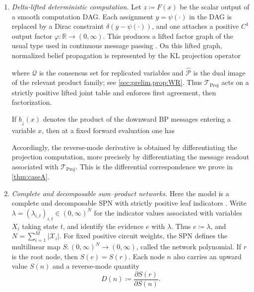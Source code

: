 \documentclass[12pt]{article}
\newcommand{\1}{\mathbb{1}}
\renewcommand{\phi}{\varphi}
\newcommand{\defeq}{\coloneq}
\theoremstyle{definition}
\newcommand*\mybluebox[1]{%
    \colorbox{myblue}{\hspace{1em}#1\hspace{1em}}}
\newcommand{\Iproj}{\overleftarrow{\pi}}     %
\newcommand{\Rproj}{\overrightarrow{\pi}}    %
\newcommand*\mygreenbox[1]{%
    \colorbox{mygreen}{\hspace{1em}#1\hspace{1em}}}
\begin{document}
\begin{enumerate}[leftmargin=2em,itemsep=0.35em]

\item[\textup{(A)}]
\emph{Delta-lifted deterministic computation.}
Let $z \coloneqq F(x)$ be the scalar output of a smooth computation DAG. Each assignment $y=\psi(\cdot)$ in the DAG is replaced by a Dirac
constraint $\delta(y-\psi(\cdot))$, and one attaches a positive $C^1$ output factor $\phi:\mathbb{R}\to(0,\infty)$. This produces a lifted factor graph of the usual type used in
continuous message passing \cite{yedidia2005constructing}. On this lifted graph, normalized belief propagation is represented by
the KL projection operator
where $\mathcal Q$ is the consensus set for replicated variables and
$\widehat{\mathcal P}$ is the dual image of the relevant product
family; see \cref{sec:prelim,prop:WR}.
Thus $\mathcal T_{\mathrm{Proj}}$ acts on a strictly positive lifted
joint table and enforces first agreement, then factorization.

If $b_\downarrow(x)$ denotes the product of the downward BP messages
entering a variable $x$, then at a fixed forward evaluation one has
Accordingly, the reverse-mode derivative is obtained by differentiating
the projection computation, more precisely by differentiating the
message readout associated with $\mathcal T_{\mathrm{Proj}}$.
This is the differential correspondence we prove in
\cref{thm:caseA}.

\item[\textup{(B)}]
\emph{Complete and decomposable sum--product networks.}
Here the model is a complete and decomposable SPN with strictly
positive leaf indicators
\cite{darwiche2003differential,poon2011spn}. Write $\lambda=(\lambda_{i,t})_{i,t}\in(0,\infty)^N$ for the indicator values associated with variables $X_i$ taking state
$t$, and identify the evidence $e$ with $\lambda$.
Thus $e\coloneqq\lambda$, and $N=\sum_{i=1}^M |\mathcal X_i|$. For fixed positive circuit weights, the SPN defines the multilinear map $S:(0,\infty)^N\to(0,\infty)$,
called the network polynomial. If $r$ is the root node, then $S(e)=S(r)$. Each node $n$ also carries an upward value $S(n)$ and a reverse-mode
quantity
\[
D(n)\coloneqq \frac{\partial S(r)}{\partial S(n)}.
\]


\end{enumerate}
\end{document}
